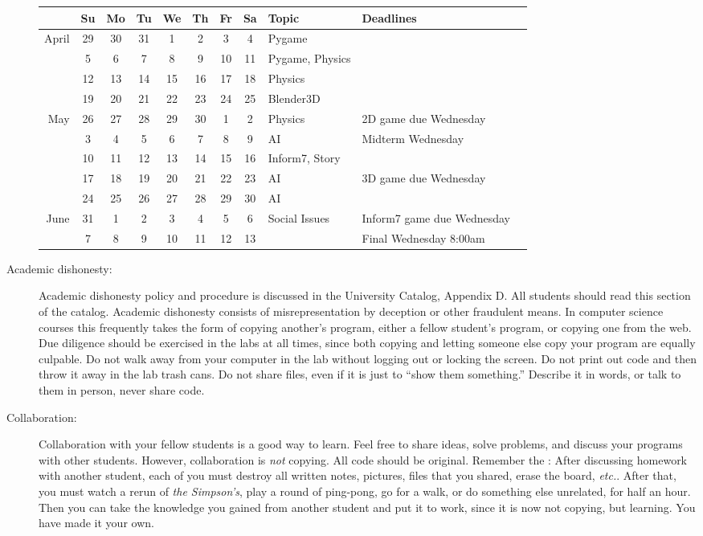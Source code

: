\documentclass{article}
\begin{document}
\begin{description}
\begin{tabular}{r|ccccccc|lll}                      
&Su& Mo& Tu& We& Th& Fr& Sa&Topic & Deadlines \\\hline  
April
&29& 30& 31&  1&  2&  3&  4& Pygame\\
& 5&  6&  7&  8&  9& 10& 11& Pygame, Physics\\
&12& 13& 14& 15& 16& 17& 18& Physics\\
&19& 20& 21& 22& 23& 24& 25& Blender3D\\
May &26& 27& 28& 29& 30&1  &2  & Physics & 2D game due Wednesday\\
& 3&  4&  5&  6&  7&  8&  9& AI & Midterm Wednesday\\
&10& 11& 12& 13& 14& 15& 16& Inform7, Story\\
&17& 18& 19& 20& 21& 22& 23& AI & 3D game due Wednesday\\
&24& 25& 26& 27& 28& 29& 30& AI\\
June
&31  &  1&  2&  3&  4&  5&  6& Social Issues & Inform7 game due Wednesday\\
& 7&  8&  9& 10& 11& 12& 13&& Final Wednesday 8:00am \\
\end{tabular}

\item [Academic dishonesty:] Academic dishonesty policy and
  procedure is discussed in the University Catalog, Appendix D.  All
  students should read this section of the catalog.  Academic
  dishonesty consists of misrepresentation by deception or other
  fraudulent means.  In computer science courses this frequently takes
  the form of copying another's program, either a fellow student's
  program, or copying one from the web.  Due diligence should be
  exercised in the labs at all times, since both copying and letting
  someone else copy your program are equally culpable.  Do not walk
  away from your computer in the lab without logging out or locking
  the screen.  Do not print out code and then throw it away in the lab
  trash cans. Do not share files, even if it is just to ``show them
  something.''  Describe it in words, or talk to them in person, never
  share code.

\item [Collaboration:] Collaboration with your fellow students is
  a good way to learn.  Feel free to share ideas, solve problems, and
  discuss your programs with other students.  However, collaboration
  is {\em not} copying.  All code should be original.  Remember the
  : After discussing homework with
  another student, each of you must destroy all written notes,
  pictures, files that you shared, erase the board, {\em
    etc.}.  After that, you must watch a rerun of {\em the Simpson's},
  play a round of ping-pong, go for a walk, or do something else
  unrelated, for half an hour.  Then you can take the knowledge you
  gained from another student and put it to work, since it is now not
  copying, but learning.  You have made it your own.

\end{description}
\end{document}
